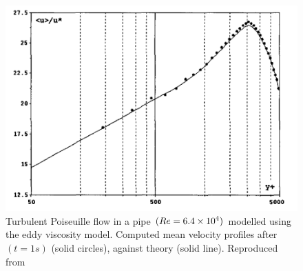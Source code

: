 \begin{figure}[H]
    \centering
    \includegraphics{Figures/research_papers/violeau2002-eddy-viscosity-result.png}
    \caption{Turbulent Poiseuille flow in a pipe $(Re = 6.4 \times {10}^{4})$ modelled using the eddy viscosity model. Computed mean velocity profiles after $(t=1s)$ (solid circles), against theory (solid line). Reproduced from \cite{VIOLEAU2002}}
    \label{fig:violeau2002-eddy-viscosity-result}
\end{figure}

